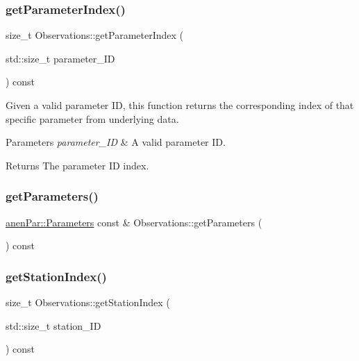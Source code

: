 \mbox{\label{class_observations_a73897578d7e1d4aaf6023857db896ee8}} 
\subsubsection{\texorpdfstring{get\+Parameter\+Index()}{getParameterIndex()}}
{\footnotesize\ttfamily size\+\_\+t Observations\+::get\+Parameter\+Index (\begin{DoxyParamCaption}\item[{std\+::size\+\_\+t}]{parameter\+\_\+\+ID }\end{DoxyParamCaption}) const}

Given a valid parameter ID, this function returns the corresponding index of that specific parameter from underlying data.


\begin{DoxyParams}{Parameters}
{\em parameter\+\_\+\+ID} & A valid parameter ID. \\
\hline
\end{DoxyParams}
\begin{DoxyReturn}{Returns}
The parameter ID index. 
\end{DoxyReturn}
\mbox{\label{class_observations_a5347196195a72495217dc0614c9224c2}} 
\subsubsection{\texorpdfstring{get\+Parameters()}{getParameters()}}
{\footnotesize\ttfamily \mbox{\hyperlink{classanen_par_1_1_parameters}{anen\+Par\+::\+Parameters}} const  \& Observations\+::get\+Parameters (\begin{DoxyParamCaption}{ }\end{DoxyParamCaption}) const}

\mbox{\label{class_observations_aa485e3d95a967b9b4efd5c4efaf0c9e1}} 
\subsubsection{\texorpdfstring{get\+Station\+Index()}{getStationIndex()}}
{\footnotesize\ttfamily size\+\_\+t Observations\+::get\+Station\+Index (\begin{DoxyParamCaption}\item[{std\+::size\+\_\+t}]{station\+\_\+\+ID }\end{DoxyParamCaption}) const}

